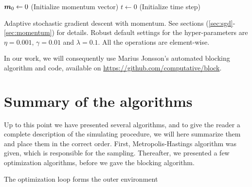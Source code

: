 \IncMargin{1em}
\begin{algorithm}
	\SetAlgoLined
	
	$\boldsymbol{{m}}_0\leftarrow 0$ (Initialize momentum vector)\;
	$t\leftarrow 0$ (Initialize time step)\;
	\caption{Adaptive stochastic gradient descent with momentum. See sections (\ref{sec:sgd}-\ref{sec:momentum}) for details. Robust default settings for the hyper-parameters are $\eta=0.001$, $\gamma=0.01$ and $\lambda=0.1$. All the operations are element-wise.}
	\label{alg:asgd}
\end{algorithm}\DecMargin{1em}

In our work, we will consequently use Marius Jonsson's automated blocking algorithm and code, available on \url{https://github.com/computative/block}.

\section{Summary of the algorithms}
Up to this point we have presented several algorithms, and to give the reader a complete description of the simulating procedure, we will here summarize them and place them in the correct order. First, Metropolis-Hastings algorithm was given, which is responsible for the sampling. Thereafter, we presented a few optimization algorithms, before we gave the blocking algorithm. 

The optimization loop forms the outer environment

